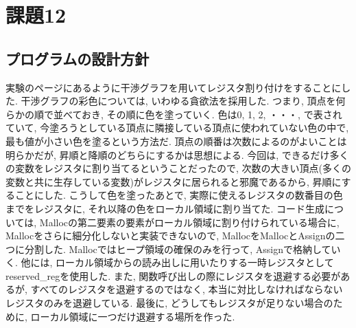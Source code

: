 \documentclass{jarticle}
\begin{document}
\section{課題12}
\subsection{プログラムの設計方針}
実験のページにあるように干渉グラフを用いてレジスタ割り付けをすることにした. 干渉グラフの彩色については, いわゆる貪欲法を採用した. つまり, 頂点を何らかの順で並べておき, その順に色を塗っていく. 色は0, 1, 2, ・・・, で表されていて, 今塗ろうとしている頂点に隣接している頂点に使われていない色の中で, 最も値が小さい色を塗るという方法だ. 頂点の順番は次数によるのがよいことは明らかだが, 昇順と降順のどちらにするかは思想による. 今回は, できるだけ多くの変数をレジスタに割り当てるということだったので, 次数の大きい頂点(多くの変数と共に生存している変数)がレジスタに居られると邪魔であるから, 昇順にすることにした. こうして色を塗ったあとで, 実際に使えるレジスタの数番目の色までをレジスタに, それ以降の色をローカル領域に割り当てた. コード生成については, Mallocの第二要素の要素がローカル領域に割り付けられている場合に, Mallocをさらに細分化しないと実装できないので, MallocをMallocとAssignの二つに分割した. Mallocではヒープ領域の確保のみを行って, Assignで格納していく. 他には, ローカル領域からの読み出しに用いたりする一時レジスタとしてreserved\_regを使用した. また, 関数呼び出しの際にレジスタを退避する必要があるが, すべてのレジスタを退避するのではなく, 本当に対比しなければならないレジスタのみを退避している. 最後に, どうしてもレジスタが足りない場合のために, ローカル領域に一つだけ退避する場所を作った.
\end{document}
